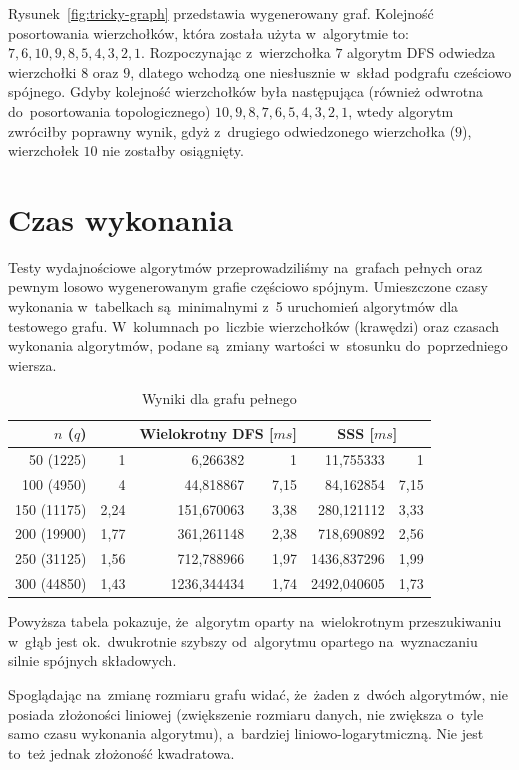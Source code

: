 \documentclass[a4paper,12pt]{mwart}
\begin{document}
Rysunek~\ref{fig:tricky-graph} przedstawia wygenerowany graf. Kolejność
posortowania wierzchołków, która została użyta w~algorytmie to:
$7, 6, 10, 9, 8, 5, 4, 3, 2, 1$. Rozpoczynając z~wierzchołka $7$ algorytm DFS
odwiedza wierzchołki $8$ oraz $9$, dlatego wchodzą one niesłusznie w~skład
podgrafu cześciowo spójnego. Gdyby kolejność wierzchołków była następująca
(również odwrotna do~posortowania topologicznego)
$10, 9, 8, 7, 6, 5, 4, 3, 2, 1$, wtedy algorytm zwróciłby poprawny wynik, gdyż
z~drugiego odwiedzonego wierzchołka ($9$), wierzchołek $10$ nie zostałby
osiągnięty.

\section{Czas wykonania}

Testy wydajnościowe algorytmów przeprowadziliśmy na~grafach pełnych oraz pewnym
losowo wygenerowanym grafie częściowo spójnym. Umieszczone czasy wykonania
w~tabelkach są~minimalnymi z~5 uruchomień algorytmów dla testowego grafu.
W~kolumnach po~liczbie wierzchołków (krawędzi) oraz czasach wykonania
algorytmów, podane są~zmiany wartości w~stosunku do~poprzedniego wiersza.

\begin{table}[H]
  \centering
  \begin{tabular}{ r r r r r r }
    \multicolumn{2}{c}{$n$ ($q$)} & \multicolumn{2}{c}{Wielokrotny DFS [$ms$]} & \multicolumn{2}{c}{SSS [$ms$]} \\
    \hline
    50 (1225) & 1 & 6,266382 & 1 & 11,755333 & 1 \\
    100 (4950) & 4 & 44,818867 & 7,15 & 84,162854 & 7,15 \\
    150 (11175) & 2,24 & 151,670063 & 3,38 & 280,121112 & 3,33 \\
    200 (19900) & 1,77 & 361,261148 & 2,38 & 718,690892 & 2,56 \\
    250 (31125) & 1,56 & 712,788966 & 1,97 & 1436,837296 & 1,99 \\
    300 (44850) & 1,43 & 1236,344434 & 1,74 & 2492,040605 & 1,73 \\
  \end{tabular}
  \caption{Wyniki dla grafu pełnego}
\end{table}

Powyższa tabela pokazuje, że~algorytm oparty na~wielokrotnym przeszukiwaniu
w~głąb jest ok.~dwukrotnie szybszy od~algorytmu opartego na~wyznaczaniu silnie
spójnych składowych.

Spoglądając na~zmianę rozmiaru grafu widać, że~żaden z~dwóch algorytmów, nie
posiada złożoności liniowej (zwiększenie rozmiaru danych, nie zwiększa o~tyle
samo czasu wykonania algorytmu), a~bardziej
liniowo-loga\dywiz{}ryt\dywiz{}miczną. Nie jest to~też jednak złożoność
kwadratowa.
\end{document}
